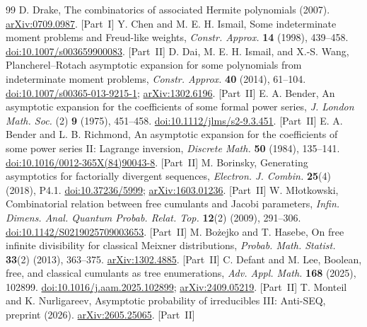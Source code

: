 \documentclass[11pt,letterpaper]{article}
\numberwithin{equation}{section}
\theoremstyle{remark}\newtheorem{remark}[theorem]{Remark}
\begin{document}
\begin{thebibliography}{99}
 D. Drake, The combinatorics of associated Hermite polynomials (2007). \href{https://arxiv.org/abs/0709.0987}{arXiv:0709.0987}. [Part~I]
 Y. Chen and M. E. H. Ismail, Some indeterminate moment problems and Freud-like weights, \emph{Constr. Approx.} \textbf{14} (1998), 439--458. \href{https://doi.org/10.1007/s003659900083}{doi:10.1007/s003659900083}. [Part~II]
 D. Dai, M. E. H. Ismail, and X.-S. Wang, Plancherel--Rotach asymptotic expansion for some polynomials from indeterminate moment problems, \emph{Constr. Approx.} \textbf{40} (2014), 61--104. \href{https://doi.org/10.1007/s00365-013-9215-1}{doi:10.1007/s00365-013-9215-1}; \href{https://arxiv.org/abs/1302.6196}{arXiv:1302.6196}. [Part~II]
 E. A. Bender, An asymptotic expansion for the coefficients of some formal power series, \emph{J. London Math. Soc.} (2) \textbf{9} (1975), 451--458. \href{https://doi.org/10.1112/jlms/s2-9.3.451}{doi:10.1112/jlms/s2-9.3.451}. [Part~II]
 E. A. Bender and L. B. Richmond, An asymptotic expansion for the coefficients of some power series II: Lagrange inversion, \emph{Discrete Math.} \textbf{50} (1984), 135--141. \href{https://doi.org/10.1016/0012-365X(84)90043-8}{doi:10.1016/0012-365X(84)90043-8}. [Part~II]
 M. Borinsky, Generating asymptotics for factorially divergent sequences, \emph{Electron. J. Combin.} \textbf{25}(4) (2018), P4.1. \href{https://doi.org/10.37236/5999}{doi:10.37236/5999}; \href{https://arxiv.org/abs/1603.01236}{arXiv:1603.01236}. [Part~II]
 W. M\l otkowski, Combinatorial relation between free cumulants and Jacobi parameters, \emph{Infin. Dimens. Anal. Quantum Probab. Relat. Top.} \textbf{12}(2) (2009), 291--306. \href{https://doi.org/10.1142/S0219025709003653}{doi:10.1142/S0219025709003653}. [Part~II]
 M. Bo\.{z}ejko and T. Hasebe, On free infinite divisibility for classical Meixner distributions, \emph{Probab. Math. Statist.} \textbf{33}(2) (2013), 363--375. \href{https://arxiv.org/abs/1302.4885}{arXiv:1302.4885}. [Part~II]
 C. Defant and M. Lee, Boolean, free, and classical cumulants as tree enumerations, \emph{Adv. Appl. Math.} \textbf{168} (2025), 102899. \href{https://doi.org/10.1016/j.aam.2025.102899}{doi:10.1016/j.aam.2025.102899}; \href{https://arxiv.org/abs/2409.05219}{arXiv:2409.05219}. [Part~II]
 T. Monteil and K. Nurligareev, Asymptotic probability of irreducibles III: Anti-SEQ, preprint (2026). \href{https://arxiv.org/abs/2605.25065}{arXiv:2605.25065}. [Part~II]

\end{thebibliography}
\end{document}
